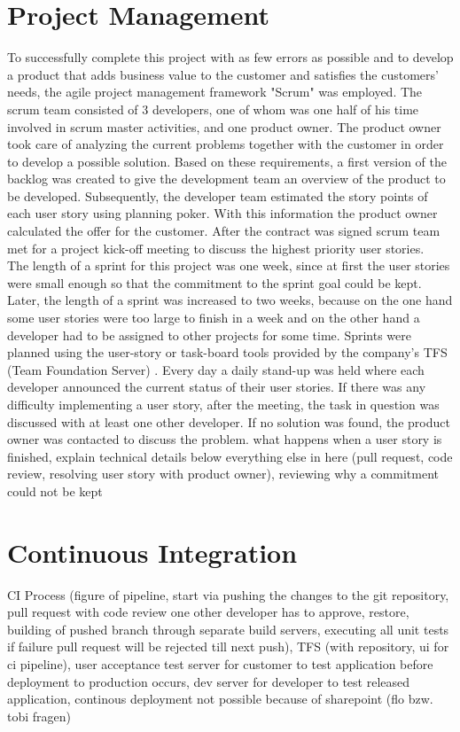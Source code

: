 \documentclass[Bachelor,BIF,english]{twbook}
\begin{document}
\section{Project Management}
To successfully complete this project with as few errors as possible and to develop a product that adds business value to the customer and satisfies the customers' needs, the agile project management framework "Scrum" \cite{Scrum} was employed. The scrum team consisted of 3 developers, one of whom was one half of his time involved in scrum master activities, and one product owner. The product owner took care of analyzing the current problems together with the customer in order to develop a possible solution. Based on these requirements, a first version of the backlog was created to give the development team an overview of the product to be developed. Subsequently, the developer team estimated the story points of each user story using planning poker. With this information the product owner calculated the offer for the customer. After the contract was signed scrum team met for a project kick-off meeting to discuss the highest priority user stories.
\\[\baselineskip]
The length of a sprint for this project was one week, since at first the user stories were small enough so that the commitment to the sprint goal could be kept. Later, the length of a sprint was increased to two weeks, because on the one hand some user stories were too large to finish in a week and on the other hand a developer had to be assigned to other projects for some time. Sprints were planned using the user-story or task-board tools provided by the company's TFS (Team Foundation Server) \cite{TFS}.
Every day a daily stand-up was held where each developer announced the current status of their user stories. If there was any difficulty implementing a user story, after the meeting, the task in question was discussed with at least one other developer. If no solution was found, the product owner was contacted to discuss the problem.
what happens when a user story is finished, explain technical details below everything else in here (pull request, code review, resolving user story with product owner), reviewing why a commitment could not be kept 

\section{Continuous Integration}
CI Process (figure of pipeline, start via pushing the changes to the git \cite{Git} repository, pull request with code review one other developer has to approve, restore, building of pushed branch through separate build servers, executing all unit tests if failure pull request will be rejected till next push), TFS (with repository, ui for ci pipeline), user acceptance test server for customer to test application before deployment to production occurs, dev server for developer to test released application, continous deployment not possible because of sharepoint (flo bzw. tobi fragen)
\end{document}
